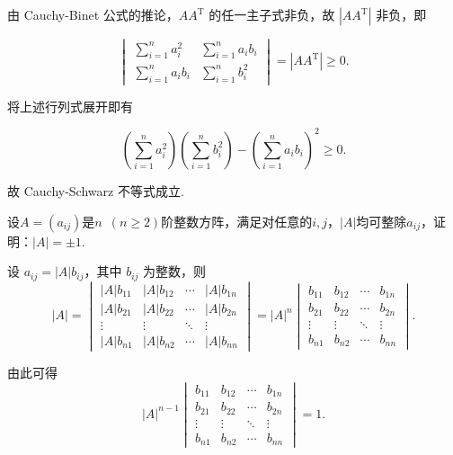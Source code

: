 \begin{exercise}
\begin{exgroup}
\begin{answer}
            由 Cauchy-Binet 公式的推论，$A A^{\mathrm{T}}$ 的任一主子式非负，故 $|AA^\mathrm{T}|$ 非负，即

            \[
                \begin{vmatrix}
                    \sum\limits_{i=1}^{n} a_i^2 & \sum\limits_{i=1}^{n} a_ib_i \\
                    \sum\limits_{i=1}^{n} a_ib_i & \sum\limits_{i=1}^{n} b_i^2
                \end{vmatrix} = |AA^\mathrm{T}| \geqslant 0.
            \]

            将上述行列式展开即有

            \[
                \left( \sum\limits_{i=1}^{n} a_i^2 \right) \left( \sum\limits_{i=1}^{n} b_i^2 \right) - \left( \sum\limits_{i=1}^{n} a_i b_i \right)^2 \geqslant 0.
            \]

            故 Cauchy-Schwarz 不等式成立.
        \end{answer}

        \item 设$A=(a_{ij})$是$n\enspace(n\geqslant 2)$阶整数方阵，满足对任意的$i,j$，$|A|$均可整除$a_{ij}$，证明：$|A|=\pm 1$.
        \begin{answer}
            设 $a_{ij} = |A| b_{ij}$，其中 $b_{ij}$ 为整数，则
            \[
                |A| = \begin{vmatrix}
                    |A| b_{11} & |A| b_{12} & \cdots & |A| b_{1n} \\
                    |A| b_{21} & |A| b_{22} & \cdots & |A| b_{2n} \\
                    \vdots     & \vdots     & \ddots & \vdots     \\
                    |A| b_{n1} & |A| b_{n2} & \cdots & |A| b_{nn}
                \end{vmatrix}
                = |A|^n \begin{vmatrix}
                    b_{11} & b_{12} & \cdots & b_{1n} \\
                    b_{21} & b_{22} & \cdots & b_{2n} \\
                    \vdots & \vdots & \ddots & \vdots \\
                    b_{n1} & b_{n2} & \cdots & b_{nn}
                \end{vmatrix}.
            \]

            由此可得
            \[
                |A|^{n-1} \begin{vmatrix}
                    b_{11} & b_{12} & \cdots & b_{1n} \\
                    b_{21} & b_{22} & \cdots & b_{2n} \\
                    \vdots & \vdots & \ddots & \vdots \\
                    b_{n1} & b_{n2} & \cdots & b_{nn}
                \end{vmatrix} = 1.
            \]


\end{answer}
\end{exgroup}
\end{exercise}
